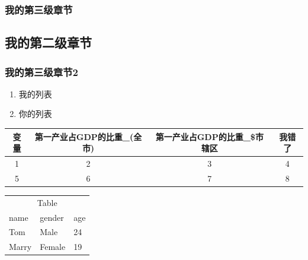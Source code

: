 \documentclass[fleqn,10pt]{wlscirep}%
\begin{document}
\subsubsection*{我的第三级章节}%
\subsection*{我的第二级章节}%
\subsubsection*{我的第三级章节2}%
\begin{enumerate}%
\item%
我的列表%
\item%
你的列表%
\end{enumerate}%
\begin{center}%
\begin{tabular}{|c|c|c|c|}%
\hline%
变量&第一产业占GDP的比重\_(全市)&第一产业占GDP的比重\_\$市辖区&我错了\\%
\hline%
1&2&3&4\\%
\hline%
5&6&7&8\\%
\hline%
\end{tabular}%
\end{center}%
\begin{tabularx}{90mm}{XXX}%
\toprule%
\multicolumn{3}{c}{Table} \\%
\cmidrule(r){1-3}%
name & gender & age \\%
\midrule%
Tom & Male & 24 \\%
Marry & Female & 19 \\%
\bottomrule%
\end{tabularx}%
\end{document}
